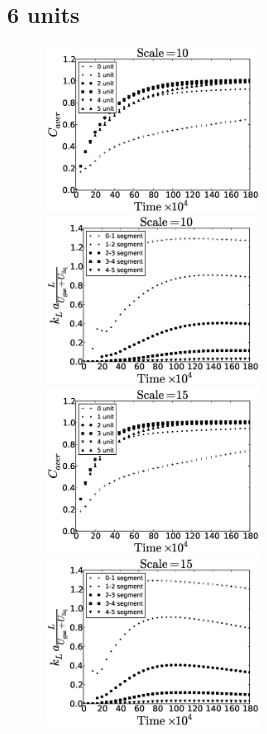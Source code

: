 \documentclass{article}
\begin{document}
\subsection{6 units} 
\begin{figure}[htb!]
\includegraphics[width=0.5\textwidth]{Figures/aver_units6scale10.eps}\hfill
\includegraphics[width=0.5\textwidth]{Figures/coeff_units6scale10.eps}\\
\includegraphics[width=0.5\textwidth]{Figures/aver_units6scale15.eps}\hfill
\includegraphics[width=0.5\textwidth]{Figures/coeff_units6scale15.eps}\\

\end{figure}
\end{document}
